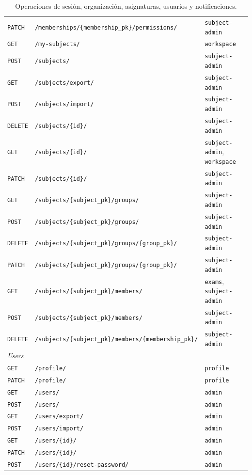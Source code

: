 \begin{table}[htbp]
\begin{tabular}{llp{3.6cm}}
    \texttt{PATCH} & \texttt{/memberships/\{membership\_pk\}/permissions/} & \texttt{subject-admin} \\
    \texttt{GET} & \texttt{/my-subjects/} & \texttt{workspace} \\
    \texttt{POST} & \texttt{/subjects/} & \texttt{subject-admin} \\
    \texttt{GET} & \texttt{/subjects/export/} & \texttt{subject-admin} \\
    \texttt{POST} & \texttt{/subjects/import/} & \texttt{subject-admin} \\
    \texttt{DELETE} & \texttt{/subjects/\{id\}/} & \texttt{subject-admin} \\
    \texttt{GET} & \texttt{/subjects/\{id\}/} & \texttt{subject-admin}, \texttt{workspace} \\
    \texttt{PATCH} & \texttt{/subjects/\{id\}/} & \texttt{subject-admin} \\
    \texttt{GET} & \texttt{/subjects/\{subject\_pk\}/groups/} & \texttt{subject-admin} \\
    \texttt{POST} & \texttt{/subjects/\{subject\_pk\}/groups/} & \texttt{subject-admin} \\
    \texttt{DELETE} & \texttt{/subjects/\{subject\_pk\}/groups/\{group\_pk\}/} & \texttt{subject-admin} \\
    \texttt{PATCH} & \texttt{/subjects/\{subject\_pk\}/groups/\{group\_pk\}/} & \texttt{subject-admin} \\
    \texttt{GET} & \texttt{/subjects/\{subject\_pk\}/members/} & \texttt{exams}, \texttt{subject-admin} \\
    \texttt{POST} & \texttt{/subjects/\{subject\_pk\}/members/} & \texttt{subject-admin} \\
    \texttt{DELETE} & \texttt{/subjects/\{subject\_pk\}/members/\{membership\_pk\}/} & \texttt{subject-admin} \\
    \midrule
    \multicolumn{3}{l}{\textit{Users}} \\
    \texttt{GET} & \texttt{/profile/} & \texttt{profile} \\
    \texttt{PATCH} & \texttt{/profile/} & \texttt{profile} \\
    \texttt{GET} & \texttt{/users/} & \texttt{admin} \\
    \texttt{POST} & \texttt{/users/} & \texttt{admin} \\
    \texttt{GET} & \texttt{/users/export/} & \texttt{admin} \\
    \texttt{POST} & \texttt{/users/import/} & \texttt{admin} \\
    \texttt{GET} & \texttt{/users/\{id\}/} & \texttt{admin} \\
    \texttt{PATCH} & \texttt{/users/\{id\}/} & \texttt{admin} \\
    \texttt{POST} & \texttt{/users/\{id\}/reset-password/} & \texttt{admin} \\
    \bottomrule
  \end{tabular}
  \caption{Operaciones de sesión, organización, asignaturas, usuarios y
    notificaciones.\label{TAB:API-ADMIN}}
\end{table}

